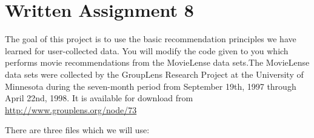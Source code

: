 \documentclass[]{svmono}
\begin{document}
\chapter{Written Assignment 8}

\noindent


The goal of this project is to use the basic recommendation principles
we have learned for user-collected data. You will modify the code
given to you which performs movie recommendations from the MovieLense
data sets.The MovieLense data sets were collected by the GroupLens Research
Project at the University of Minnesota during the seven-month period
from September 19th, 1997 through April 22nd, 1998. It is available
for download from \url{http://www.grouplens.org/node/73}

There are three files which we will use:
\end{document}
